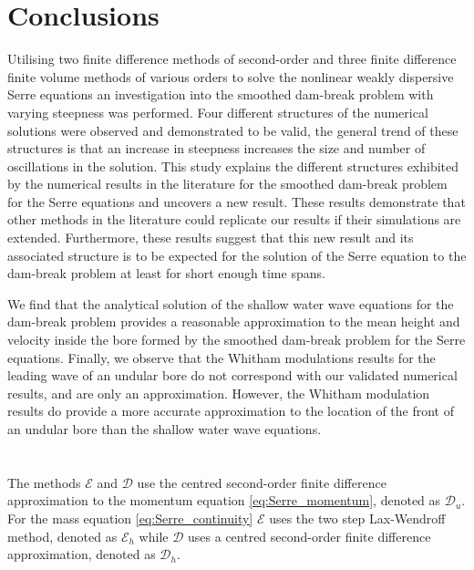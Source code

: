 \documentclass[times]{elsarticle}
\begin{document}
\section{Conclusions}
\label{section:Conclusions}
Utilising two finite difference methods of second-order and three finite difference finite volume methods of various orders to solve the nonlinear weakly dispersive Serre equations an investigation into the smoothed dam-break problem with varying steepness was performed. Four different structures of the numerical solutions were observed and demonstrated to be valid, the general trend of these structures is that an increase in steepness increases the size and number of oscillations in the solution. This study explains the different structures exhibited by the numerical results in the literature for the smoothed dam-break problem for the Serre equations and uncovers a new result. These results demonstrate that other methods in the literature could replicate our results if their simulations are extended. Furthermore, these results suggest that this new result and its associated structure is to be expected for the solution of the Serre equation to the dam-break problem at least for short enough time spans.

We find that the analytical solution of the shallow water wave equations for the dam-break problem provides a reasonable approximation to the mean height and velocity inside the bore formed by the smoothed dam-break problem for the Serre equations. Finally, we observe that the Whitham modulations results for the leading wave of an undular bore do not correspond with our validated numerical results, and are only an approximation. However, the Whitham modulation results do provide a more accurate approximation to the location of the front of an undular bore than the shallow water wave equations.





\newpage
\appendix{}
\label{sec:appendix}
\section{}
The methods $\mathcal{E}$ and $\mathcal{D}$ use the centred second-order finite difference approximation to the momentum equation \eqref{eq:Serre_momentum}, denoted as $\mathcal{D}_u$. For the mass equation \eqref{eq:Serre_continuity} $\mathcal{E}$ uses the two step Lax-Wendroff method, denoted as $\mathcal{E}_h$ while $\mathcal{D}$ uses a centred second-order finite difference approximation, denoted as $\mathcal{D}_h$.
\end{document}

